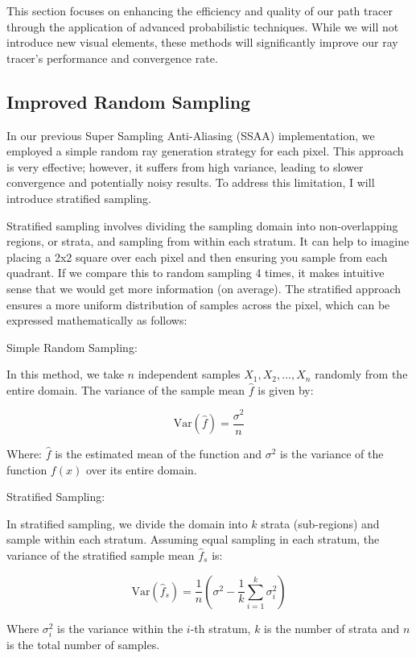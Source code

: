 \documentclass[12pt]{article}
\begin{document}
This section focuses on enhancing the efficiency and quality of our path tracer through the application of advanced probabilistic techniques. While we will not introduce new visual elements, these methods will significantly improve our ray tracer's performance and convergence rate.

\subsection{Improved Random Sampling}
In our previous Super Sampling Anti-Aliasing (SSAA) implementation, we employed a simple random ray generation strategy for each pixel. This approach is very effective; however, it suffers from high variance, leading to slower convergence and potentially noisy results. To address this limitation, I will introduce stratified sampling.

Stratified sampling involves dividing the sampling domain into non-overlapping regions, or strata, and sampling from within each stratum. It can help to imagine placing a 2x2 square over each pixel and then ensuring you sample from each quadrant. If we compare this to random sampling 4 times, it makes intuitive sense that we would get more information (on average).
The stratified approach ensures a more uniform distribution of samples across the pixel, which can be expressed mathematically as follows:

Simple Random Sampling:

In this method, we take $n$ independent samples $X_1, X_2, ..., X_n$ randomly from the entire domain. The variance of the sample mean $\hat{f}$ is given by:

\[
    \text{Var}(\hat{f}) = \frac{\sigma^2}{n}
\]

Where:
$\hat{f}$ is the estimated mean of the function and $\sigma^2$ is the variance of the function $f(x)$ over its entire domain.

Stratified Sampling:

In stratified sampling, we divide the domain into $k$ strata (sub-regions) and sample within each stratum. Assuming equal sampling in each stratum, the variance of the stratified sample mean $\hat{f}_s$ is:

\[
    \text{Var}(\hat{f}_s) = \frac{1}{n} \left( \sigma^2 - \frac{1}{k} \sum_{i=1}^k \sigma_i^2 \right)
\]

Where $\sigma_i^2$ is the variance within the $i$-th stratum, $k$ is the number of strata and $n$ is the total number of samples.
\end{document}
